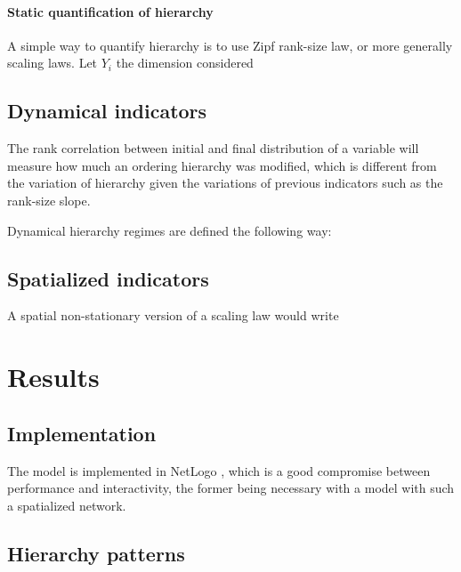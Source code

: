 \documentclass[english,fleqn,allpages]{ISTE_science}[2018/07/30]
\begin{document}
\paragraph{Static quantification of hierarchy}

A simple way to quantify hierarchy is to use Zipf rank-size law, or more generally scaling laws. Let $Y_i$ the dimension considered



\subsection{Dynamical indicators}

The rank correlation between initial and final distribution of a variable will measure how much an ordering hierarchy was modified, which is different from the variation of hierarchy given the variations of previous indicators such as the rank-size slope.

Dynamical hierarchy regimes are defined the following way: 


\subsection{Spatialized indicators}

A spatial non-stationary version of a scaling law would write




\section{Results}


\subsection{Implementation}

The model is implemented in NetLogo \cite{tisue2004netlogo}, which is a good compromise between performance and interactivity, the former being necessary with a model with such a spatialized network. 


\subsection{Hierarchy patterns}

\end{document}
